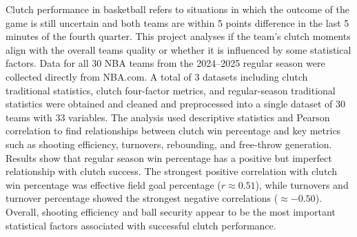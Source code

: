 Clutch performance in basketball refers to situations in which the outcome of the game is still uncertain and both teams 
are within 5 points difference in the last 5 minutes of the fourth quarter. This project analyses if the team’s clutch 
moments align with the overall teams quality or whether it is influenced by some statistical factors. Data for all 
30 NBA teams from the 2024–2025 regular season were collected directly from NBA.com.  A total of 3 datasets including 
clutch traditional statistics, clutch four-factor metrics, and regular-season traditional statistics were obtained and 
cleaned and preprocessed into a single dataset of 30 teams with 33 variables. The analysis used descriptive statistics 
and Pearson correlation to find relationships between clutch win percentage and key metrics such as shooting efficiency, 
turnovers, rebounding, and free-throw generation. Results show that regular season win percentage has a positive but 
imperfect relationship with clutch success. The strongest positive correlation with clutch win percentage was effective 
field goal percentage ($r \approx 0.51$), while turnovers and turnover percentage showed the strongest negative correlations
($\approx -0.50$). Overall, shooting efficiency and ball security appear to be the most important statistical factors associated 
with successful clutch performance.
